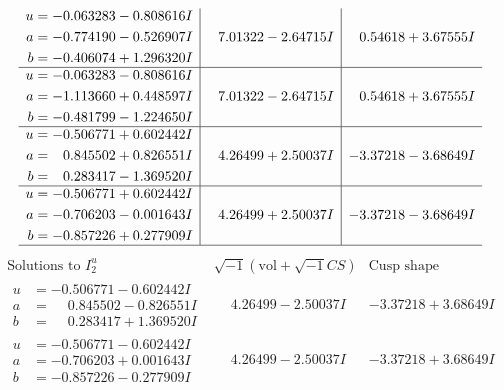 \documentclass[1p]{elsarticle_modified}
\theoremstyle{definition}
\newcommand{\I}{\sqrt{-1}}
\begin{document}
$$\begin{array}{c|c|c}
\begin{aligned}
u &= -0.063283 - 0.808616 I \\
a &= -0.774190 - 0.526907 I \\
b &= -0.406074 + 1.296320 I\end{aligned}
 & \phantom{-}7.01322 - 2.64715 I & \phantom{-}0.54618 + 3.67555 I \\ \hline\begin{aligned}
u &= -0.063283 - 0.808616 I \\
a &= -1.113660 + 0.448597 I \\
b &= -0.481799 - 1.224650 I\end{aligned}
 & \phantom{-}7.01322 - 2.64715 I & \phantom{-}0.54618 + 3.67555 I \\ \hline\begin{aligned}
u &= -0.506771 + 0.602442 I \\
a &= \phantom{-}0.845502 + 0.826551 I \\
b &= \phantom{-}0.283417 - 1.369520 I\end{aligned}
 & \phantom{-}4.26499 + 2.50037 I & -3.37218 - 3.68649 I \\ \hline\begin{aligned}
u &= -0.506771 + 0.602442 I \\
a &= -0.706203 - 0.001643 I \\
b &= -0.857226 + 0.277909 I\end{aligned}
 & \phantom{-}4.26499 + 2.50037 I & -3.37218 - 3.68649 I\\
 \hline 
 \end{array}$$\newpage$$\begin{array}{c|c|c}  
\text{Solutions to }I^u_{2}& \I (\text{vol} + \sqrt{-1}CS) & \text{Cusp shape}\\
 \hline 
\begin{aligned}
u &= -0.506771 - 0.602442 I \\
a &= \phantom{-}0.845502 - 0.826551 I \\
b &= \phantom{-}0.283417 + 1.369520 I\end{aligned}
 & \phantom{-}4.26499 - 2.50037 I & -3.37218 + 3.68649 I \\ \hline\begin{aligned}
u &= -0.506771 - 0.602442 I \\
a &= -0.706203 + 0.001643 I \\
b &= -0.857226 - 0.277909 I\end{aligned}
 & \phantom{-}4.26499 - 2.50037 I & -3.37218 + 3.68649 I \\ \hline\begin{aligned}

\end{aligned}
\end{array}$$
\end{document}
